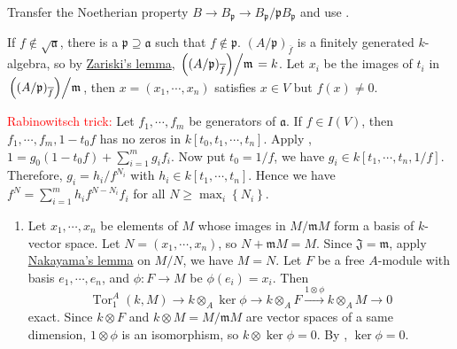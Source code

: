 \begin{exercise}\label{ex7.13}
	Transfer the Noetherian property $B\rightarrow B_\mathfrak{p}\rightarrow B_\mathfrak{p}/\mathfrak{p}B_\mathfrak{p}$ and use .
\end{exercise}

\begin{exercise}[\textcolor{red}{Hilbert's Nullstellensatz}]\label{ex7.14}
	If $f\notin\sqrt{\mathfrak{a}}$, there is a $\mathfrak{p}\supseteq\mathfrak{a}$ such that $f\notin\mathfrak{p}$. $(A/\mathfrak{p})_{\overline{f}}$ is a finitely generated $k$-algebra, so by \hyperref[7.9]{Zariski's lemma}, $\left.\left((A/\mathfrak{p})_{\overline{f}}\right)\middle/\mathfrak{m}\right.=k$. Let $x_i$ be the images of $t_i$ in $\left.\left((A/\mathfrak{p})_{\overline{f}}\right)\middle/\mathfrak{m}\right.$, then $x=\left(x_1,\cdots,x_n\right)$ satisfies $x\in V$ but $f(x)\neq0$.
	
	\textcolor{red}{Rabinowitsch trick:} \textcolor{green!70!black}{Let $f_1,\cdots,f_m$ be generators of $\mathfrak{a}$. If $f\in I(V)$, then $f_1,\cdots,f_m,1-t_0f$ has no zeros in $k\left[t_0,t_1,\cdots,t_n\right]$. Apply , $1=g_0\left(1-t_0f\right)+\sum_{i=1}^mg_if_i$. Now put $t_0=1/f$, we have $g_i\in k\left[t_1,\cdots,t_n,1/f\right]$. Therefore, $g_i=h_i/f^{N_i}$ with $h_i\in k\left[t_1,\cdots,t_n\right]$. Hence we have $f^N=\sum_{i=1}^mh_if^{N-N_i}f_i$ for all $N\geqslant\max_i\left\{N_i\right\}$.}
\end{exercise}

\begin{exercise}\label{ex7.15}
	\begin{enumerate}
		\item[(iv) $\Rightarrow$ (i)] Let $x_1,\cdots,x_n$ be elements of $M$ whose images in $M/\mathfrak{m}M$ form a basis of $k$-vector space. Let $N=\left(x_1,\cdots,x_n\right)$, so $N+\mathfrak{m}M=M$. Since $\mathfrak{J}=\mathfrak{m}$, apply \hyperref[2.6]{Nakayama's lemma} on $M/N$, we have $M=N$. Let $F$ be a free $A$-module with basis $e_1,\cdots,e_n$, and $\phi:F\rightarrow M$ be $\phi\left(e_i\right)=x_i$. Then 
		\begin{equation*}
			\operatorname{Tor}_1^A(k,M)\rightarrow k\otimes_A\ker\phi\rightarrow k\otimes_AF\xrightarrow{1\otimes\phi}k\otimes_AM\rightarrow0
		\end{equation*}
		exact. Since $k\otimes F$ and $k\otimes M=M/\mathfrak{m}M$ are vector spaces of a same dimension, $1\otimes\phi$ is an isomorphism, so $k\otimes\ker\phi=0$. By , $\ker\phi=0$.
	\end{enumerate}
\end{exercise}

